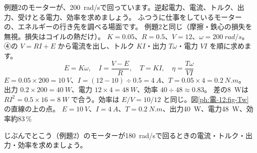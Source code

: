 \label{ph:電-12:ex3}
\begin{phreidai}
例題2のモーターが、\qty{200}{rad/s}で回っています。逆起電力、電流、トルク、出力、受けとる電力、効率を求めましょう。
\phbamen
ふつうに仕事をしているモーターの、エネルギーの行き先を調べる場面です。
\phmushi
例題2と同じ（摩擦・鉄心の損失を無視。損失はコイルの熱だけ）。
\phzu
$K=0.05$、$R=0.5$、$V=12$、$\omega=\qty{200}{rad/s}$。
\phriyu
④の $V=RI+E$ から電流を出し、トルク $KI$・出力 $T\omega$・電力 $VI$ を順に求めます。
\phtateru
\[E=K\omega,\quad I=\frac{V-E}{R},\quad T=KI,\quad \eta=\frac{T\omega}{VI}\]
\phtoku
$E=0.05\times200=\qty{10}{V}$、$I=(12-10)\div0.5=\qty{4}{A}$、$T=0.05\times4=\qty{0.2}{N.m}$。\\
出力 $0.2\times200=\qty{40}{W}$、電力 $12\times4=\qty{48}{W}$、効率 $40\div48\approx0.83$。
\phtashikame
差の\qty{8}{W}は $RI^2=0.5\times16=\qty{8}{W}$ で合う。効率は $E/V=10/12$ と同じ。図\ref{ph:電-12:fig-Tw}の直線の上の点。
\kotae $E=\qty{10}{V}$、$I=\qty{4}{A}$、$T=\qty{0.2}{N.m}$、出力\qty{40}{W}、電力\qty{48}{W}、効率約83\,\%
\end{phreidai}
\begin{jibun}
じぶんでとこう（例題2）のモーターが\qty{180}{rad/s}で回るときの電流・トルク・出力・効率を求めましょう。
\end{jibun}

